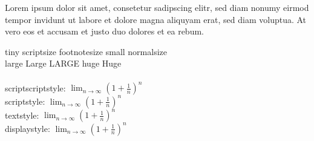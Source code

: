 \documentclass[a5paper]{book}
\begin{document}
Lorem ipsum dolor sit amet, consetetur sadipscing elitr, sed diam
nonumy eirmod tempor invidunt ut labore et dolore magna aliquyam
erat,
sed diam voluptua. At vero eos et accusam et justo duo dolores et ea
rebum.

\noindent \tiny tiny
\scriptsize scriptsize
\footnotesize footnotesize
\small small
\normalsize normalsize \\
\large large
\Large Large
\LARGE LARGE
\huge huge
\Huge Huge\\
\\

\normalsize
\noindent
scriptscriptstyle: $\scriptscriptstyle \lim_{n \rightarrow \infty} (1 + \frac{1}{n})^n$ \\
scriptstyle: $\scriptstyle \lim_{n \rightarrow \infty} (1 + \frac{1}{n})^n$ \\
textstyle: $\textstyle \lim_{n \rightarrow \infty} (1 + \frac{1}{n})^n$ \\
displaystyle: $\displaystyle \lim_{n \rightarrow \infty} (1 + \frac{1}{n})^n$ \\
\end{document}
